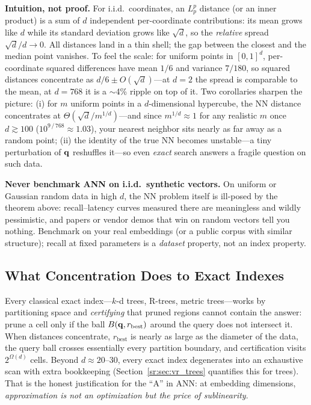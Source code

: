 \textbf{Intuition, not proof.} For i.i.d.\ coordinates, an $L_p^p$ distance (or an inner product) is a sum of $d$ independent per-coordinate contributions: its mean grows like $d$ while its standard deviation grows like $\sqrt{d}$, so the \emph{relative} spread $\sqrt{d}/d \to 0$. All distances land in a thin shell; the gap between the closest and the median point vanishes. To feel the scale: for uniform points in $[0,1]^d$, per-coordinate squared differences have mean $1/6$ and variance $7/180$, so squared distances concentrate as $d/6 \pm O(\sqrt{d})$---at $d = 2$ the spread is comparable to the mean, at $d = 768$ it is a $\sim$4\% ripple on top of it. Two corollaries sharpen the picture: (i) for $m$ uniform points in a $d$-dimensional hypercube, the NN distance concentrates at $\Theta(\sqrt{d}/m^{1/d})$---and since $m^{1/d} \approx 1$ for any realistic $m$ once $d \gtrsim 100$ ($10^{9\,/\,768} \approx 1.03$), your nearest neighbor sits nearly as far away as a random point; (ii) the identity of the true NN becomes unstable---a tiny perturbation of $\mathbf{q}$ reshuffles it---so even \emph{exact} search answers a fragile question on such data.

\begin{warningbox}
\textbf{Never benchmark ANN on i.i.d.\ synthetic vectors.} On uniform or Gaussian random data in high $d$, the NN problem itself is ill-posed by the theorem above: recall--latency curves measured there are meaningless and wildly pessimistic, and papers or vendor demos that win on random vectors tell you nothing. Benchmark on your real embeddings (or a public corpus with similar structure); recall at fixed parameters is a \emph{dataset} property, not an index property.
\end{warningbox}

\subsection{What Concentration Does to Exact Indexes}

Every classical exact index---$k$-d trees, R-trees, metric trees---works by partitioning space and \emph{certifying} that pruned regions cannot contain the answer: prune a cell only if the ball $B(\mathbf{q}, r_{\text{best}})$ around the query does not intersect it. When distances concentrate, $r_{\text{best}}$ is nearly as large as the diameter of the data, the query ball crosses essentially every partition boundary, and certification visits $2^{\Omega(d)}$ cells. Beyond $d \approx 20$--$30$, every exact index degenerates into an exhaustive scan with extra bookkeeping (Section~\ref{sr:sec:vr_trees} quantifies this for trees). That is the honest justification for the ``A'' in ANN: at embedding dimensions, \emph{approximation is not an optimization but the price of sublinearity}.


